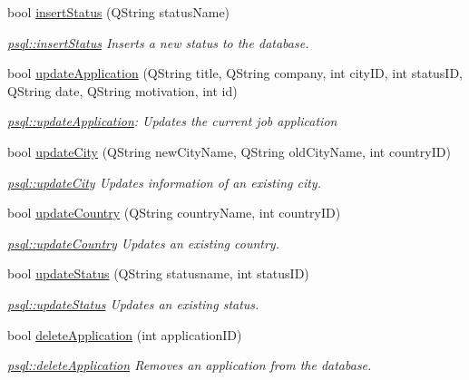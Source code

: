 \begin{DoxyCompactItemize}
bool \mbox{\hyperlink{classpsql_a601ee0bdc9430b1d674a857f7c94b767}{insert\+Status}} (Q\+String status\+Name)
\begin{DoxyCompactList}\small\item\em \mbox{\hyperlink{classpsql_a601ee0bdc9430b1d674a857f7c94b767}{psql\+::insert\+Status}} Inserts a new status to the database. \end{DoxyCompactList}\item 
bool \mbox{\hyperlink{classpsql_a836eea3c6deb2d6a3a357193a99d6ee7}{update\+Application}} (Q\+String title, Q\+String company, int city\+ID, int status\+ID, Q\+String date, Q\+String motivation, int id)
\begin{DoxyCompactList}\small\item\em \mbox{\hyperlink{classpsql_a836eea3c6deb2d6a3a357193a99d6ee7}{psql\+::update\+Application}}\+: Updates the current job application \end{DoxyCompactList}\item 
bool \mbox{\hyperlink{classpsql_af2d88341e21459895470da26fa1826f0}{update\+City}} (Q\+String new\+City\+Name, Q\+String old\+City\+Name, int country\+ID)
\begin{DoxyCompactList}\small\item\em \mbox{\hyperlink{classpsql_af2d88341e21459895470da26fa1826f0}{psql\+::update\+City}} Updates information of an existing city. \end{DoxyCompactList}\item 
bool \mbox{\hyperlink{classpsql_ae662278c5fb8ff3471ee1442e69482e2}{update\+Country}} (Q\+String country\+Name, int country\+ID)
\begin{DoxyCompactList}\small\item\em \mbox{\hyperlink{classpsql_ae662278c5fb8ff3471ee1442e69482e2}{psql\+::update\+Country}} Updates an existing country. \end{DoxyCompactList}\item 
bool \mbox{\hyperlink{classpsql_a620364c99c98e20720908deb045536a0}{update\+Status}} (Q\+String statusname, int status\+ID)
\begin{DoxyCompactList}\small\item\em \mbox{\hyperlink{classpsql_a620364c99c98e20720908deb045536a0}{psql\+::update\+Status}} Updates an existing status. \end{DoxyCompactList}\item 
bool \mbox{\hyperlink{classpsql_a999ee8e2d813892411ef502ebc055a79}{delete\+Application}} (int application\+ID)
\begin{DoxyCompactList}\small\item\em \mbox{\hyperlink{classpsql_a999ee8e2d813892411ef502ebc055a79}{psql\+::delete\+Application}} Removes an application from the database. \end{DoxyCompactList}\item 

\end{DoxyCompactItemize}
